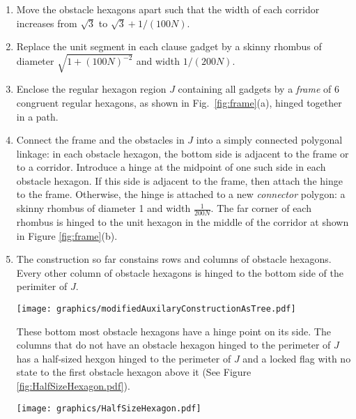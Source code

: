 \documentclass[10pt]{CSUNthesis}
\theoremstyle{plain}%
\theoremstyle{definition}
\theoremstyle{remark}
\newcommand{\lr}[1]{\left( #1 \right)}
\begin{document}
\begin{enumerate}
\item Move the obstacle hexagons apart such that the width of each corridor increases from $\sqrt{3}$ to $\sqrt{3}+1/(100N)$.
\item Replace the unit segment in each clause gadget by a skinny rhombus of diameter $\sqrt{1 + \lr{100N}^{-2}}$ and width $1/(200N)$.
\item Enclose the regular hexagon region $J$ containing all gadgets by a \emph{frame} of 6 congruent regular hexagons, as shown in Fig.~\ref{fig:frame}(a), hinged together in a path.

\item Connect the frame and the obstacles in $J$ into a simply connected polygonal linkage: in each obstacle
hexagon, the bottom side is adjacent to the frame or to a corridor.
Introduce a hinge at the midpoint of one such side in each obstacle hexagon. 
If this side is adjacent to the frame, then attach the hinge to the frame. 
Otherwise, the hinge is attached to a new \emph{connector} polygon: a skinny rhombus of diameter 1 and width $\frac{1}{200N}$. 
The far corner of each rhombus is hinged to the unit hexagon in the middle of the corridor at shown in Figure \ref{fig:frame}(b).
\item The construction so far constains rows and columns of obstacle hexagons.
Every other column of obstacle hexagons is hinged to the bottom side of the perimiter of $J$.

\begin{minipage}{\linewidth}
\begin{center}
\texttt{[image: graphics/modifiedAuxilaryConstructionAsTree.pdf]}
\label{fig:modifiedAuxilaryConstructionAsTree.pdf}
\end{center}
\end{minipage}

These bottom most obstacle hexagons have a hinge point on its side.
The columns that do not have an obstacle hexagon hinged to the perimeter of $J$ has a half-sized hexgon hinged to the perimeter of $J$ and a locked flag with no state to the first obstacle hexagon above it (See Figure \ref{fig:HalfSizeHexagon.pdf}).

\begin{minipage}{\linewidth}
\begin{center}
\texttt{[image: graphics/HalfSizeHexagon.pdf]}
\label{fig:HalfSizeHexagon.pdf}
\end{center}
\end{minipage}
\end{enumerate}
\end{document}
